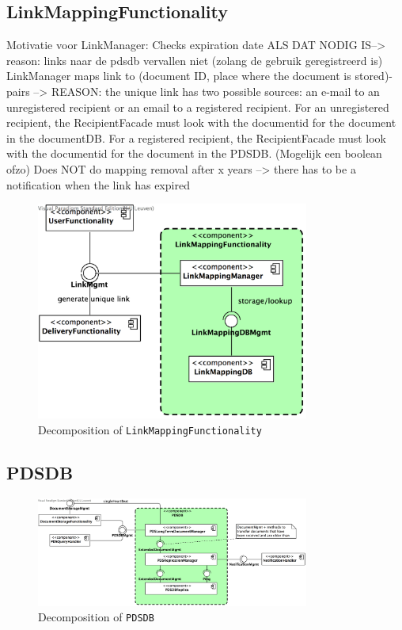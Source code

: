 \documentclass[a4paper,10pt]{article}
\begin{document}
\subsection{LinkMappingFunctionality}\label{subsec:decomp-LinkMappingFunctionality}
Motivatie voor LinkManager: Checks expiration date ALS DAT NODIG IS--> reason: links naar de pdsdb vervallen niet (zolang de gebruik geregistreerd is)
LinkManager maps link to (document ID, place where the document is stored)-pairs --> REASON: the unique link has two possible sources: an e-mail to an unregistered recipient or an email to a registered recipient. For an unregistered recipient, the RecipientFacade must look with the documentid for the document in the documentDB. For a registered recipient, the RecipientFacade must look with the documentid for the document  in the PDSDB. (Mogelijk een boolean ofzo)
Does NOT do mapping removal after x years --> there has to be a notification when the link has expired
\begin{figure}[!htp]
	\centering
	\includegraphics[width=0.8\textwidth]{LinkMappingFunctionality.png}
	\caption{Decomposition of \texttt{LinkMappingFunctionality}}
	\label{fig:decomp-LinkMappingFunctionality}
\end{figure}
\FloatBarrier

\subsection{PDSDB}\label{subsec:decomp-PDSDB}
\begin{figure}[!htp]
	\centering
	\includegraphics[width=0.8\textwidth]{PDSDB.png}
	\caption{Decomposition of \texttt{PDSDB}}
	\label{fig:decomp-PDSDB}
\end{figure}
\FloatBarrier
\end{document}
